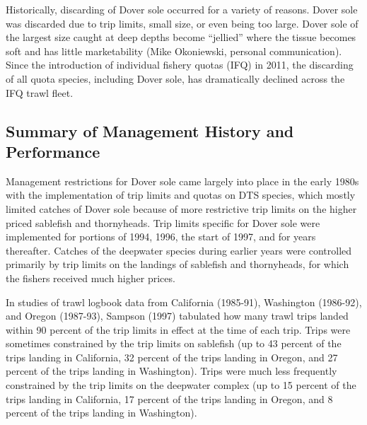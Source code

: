 \documentclass[11pt,
  english,
  a4paper,
]{article}
\begin{document}
\leavevmode\tagmcend\tagstructend\par


Historically, discarding of Dover sole occurred for a variety of reasons. Dover sole was discarded due to trip limits, small size, or even being too large. Dover sole of the largest size caught at deep depths become ``jellied'' where the tissue becomes soft and has little marketability (Mike Okoniewski, personal communication). Since the introduction of individual fishery quotas (IFQ) in 2011, the discarding of all quota species, including Dover sole, has dramatically declined across the IFQ trawl fleet.

\leavevmode\tagmcend\tagstructend\par


\hypertarget{summary-of-management-history-and-performance}{%
\subsection{Summary of Management History and Performance}\label{summary-of-management-history-and-performance}}

\leavevmode\tagmcend\tagstructend


Management restrictions for Dover sole came largely into place in the early 1980s with the implementation of trip limits and quotas on DTS species, which mostly limited catches of Dover sole because of more restrictive trip limits on the higher priced sablefish and thornyheads. Trip limits specific for Dover sole were implemented for portions of 1994, 1996, the start of 1997, and for years thereafter. Catches of the deepwater species during earlier years were controlled primarily by trip limits on the landings of sablefish and thornyheads, for which the fishers received much higher prices.

\leavevmode\tagmcend\tagstructend\par


In studies of trawl logbook data from California (1985-91), Washington (1986-92), and Oregon (1987-93), Sampson {(1997)\leavevmode\tagmcend\tagstructend} tabulated how many trawl trips landed within 90 percent of the trip limits in effect at the time of each trip. Trips were sometimes constrained by the trip limits on sablefish (up to 43 percent of the trips landing in California, 32 percent of the trips landing in Oregon, and 27 percent of the trips landing in Washington). Trips were much less frequently constrained by the trip limits on the deepwater complex (up to 15 percent of the trips landing in California, 17 percent of the trips landing in Oregon, and 8 percent of the trips landing in Washington).
\end{document}
